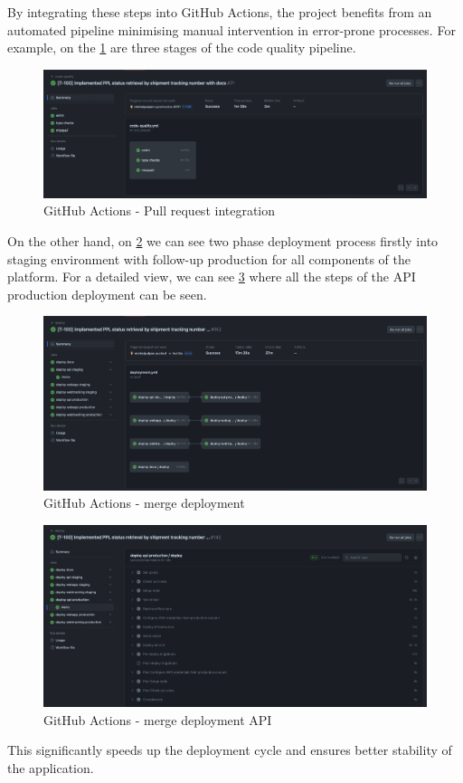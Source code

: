 By integrating these steps into GitHub Actions, the project benefits from an automated pipeline minimising manual intervention in error-prone processes.
For example, on the \ref{img06:fig_github_actions_integration} are three stages of the code quality pipeline.
\begin{figure}[p]\centering
\includegraphics[width=140mm]{img/chap06/fig_github_actions_integration.png}
\caption{GitHub Actions - Pull request integration}
\label{img06:fig_github_actions_integration}
\end{figure}
On the other hand, on \ref{img06:fig_github_actions_deployment} we can see two phase deployment process firstly into staging environment with follow-up production for all components of the platform. For a detailed view, we can see \ref{img06:fig_github_actions_api_deployment} where all the steps of the API production deployment can be seen.

\begin{figure}[p]\centering
\includegraphics[width=140mm]{img/chap06/fig_github_actions_deployment.png}
\caption{GitHub Actions - merge deployment}
\label{img06:fig_github_actions_deployment}
\end{figure}
\begin{figure}[p]\centering
\includegraphics[width=140mm]{img/chap06/fig_github_actions_api_deployment.png}
\caption{GitHub Actions - merge deployment API}
\label{img06:fig_github_actions_api_deployment}
\end{figure}

This significantly speeds up the deployment cycle and ensures better stability of the application.




